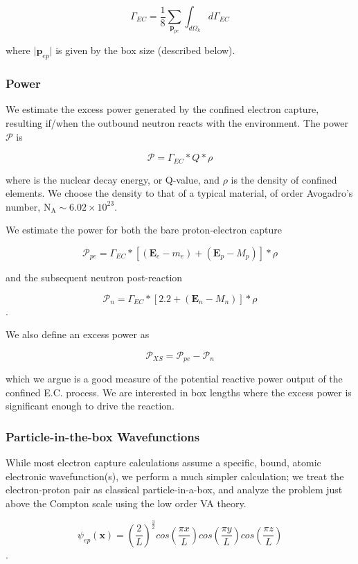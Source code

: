 \documentclass[%
 aip,
 jmp,%
 amsmath,amssymb,
 reprint,%
]{revtex4-1}
\begin{document}
$$\Gamma_{EC}=\frac{1}{8}\sum_{\mathbf{p}_{pe}}\int_{d\Omega_{k}}d\Gamma_{EC}$$

where $\big\vert\mathbf{p}_{ep}\big\vert$ is given by the box size (described below).

\subsubsection{Power}

We  estimate the excess power generated by the confined electron capture, resulting if/when the outbound neutron reacts with the environment. 
The power $\mathcal{P}$ is

$$\mathcal{P}=\Gamma_{EC}*Q*\rho$$

where is the nuclear decay energy, or Q-value, and $\rho$ is the  density of confined elements.  We choose the density to that of a typical material, of order Avogadro's number, $\mathrm{N_{A}}\sim6.02\times10^{23}$.

We estimate the power for both the bare proton-electron capture

$$\mathcal{P}_{pe}=\Gamma_{EC}*\left[(\mathbf{E}_{e}-m_{e})+(\mathbf{E}_{p}-M_{p})\right]*\rho$$

and the subsequent neutron post-reaction

$$\mathcal{P}_{n}=\Gamma_{EC}*\left[2.2+(\mathbf{E}_{n}-M_{n})\right]*\rho$$.

We also define an excess power as

$$\mathcal{P}_{XS}=\mathcal{P}_{pe}-\mathcal{P}_{n}$$

which we argue is a good measure of the potential reactive power output of the confined E.C. process. We are interested in box lengths where the excess power is significant enough to drive the reaction.

\subsubsection{Particle-in-the-box Wavefunctions}

While most electron capture calculations assume a specific, bound, atomic electronic wavefunction(s), we perform a much simpler calculation; we treat the electron-proton pair as classical particle-in-a-box,  and analyze the problem just above the Compton scale using the low order VA theory.

$$\psi_{ep}(\mathbf{x})=\left(\dfrac{2}{L}\right)^{\frac{3}{2}}cos\left(\dfrac{\pi x}{L}\right)cos\left(\dfrac{\pi y}{L}\right)cos\left(\dfrac{\pi z}{L}\right)$$.
\end{document}

